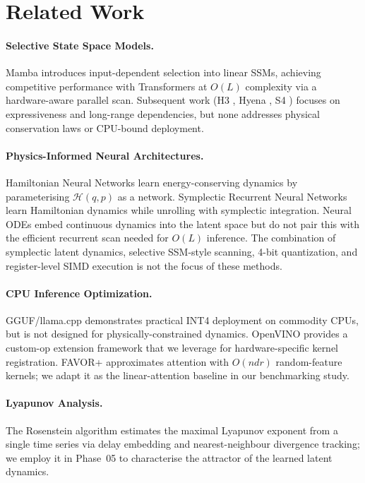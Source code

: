 \documentclass[10pt,twocolumn]{article}
\newcommand{\calH}{\mathcal{H}}
\begin{document}
\section{Related Work}
\label{sec:related}

\paragraph{Selective State Space Models.}
Mamba \cite{gu2023mamba} introduces input-dependent selection into linear SSMs,
achieving competitive performance with Transformers at $O(L)$ complexity via a
hardware-aware parallel scan.
Subsequent work (H3 \cite{fu2022hungry}, Hyena \cite{poli2023hyena},
S4 \cite{gu2021efficiently}) focuses on expressiveness and long-range
dependencies, but none addresses physical conservation laws
or CPU-bound deployment.

\paragraph{Physics-Informed Neural Architectures.}
Hamiltonian Neural Networks \cite{greydanus2019hamiltonian} learn
energy-conserving dynamics by parameterising $\calH(q,p)$ as a network.
Symplectic Recurrent Neural Networks \cite{chen2019symplectic} learn
Hamiltonian dynamics while unrolling with symplectic integration.
Neural ODEs \cite{chen2018neural} embed continuous dynamics into the
latent space but do not pair this with the efficient recurrent scan
needed for $O(L)$ inference.
The combination of symplectic latent dynamics, selective SSM-style scanning,
4-bit quantization, and register-level SIMD execution is not the focus of
these methods.

\paragraph{CPU Inference Optimization.}
GGUF/llama.cpp \cite{llamacpp} demonstrates practical INT4 deployment on
commodity CPUs, but is not designed for physically-constrained dynamics.
OpenVINO \cite{openvino} provides a custom-op extension framework that
we leverage for hardware-specific kernel registration.
FAVOR+ \cite{choromanski2020rethinking} approximates attention with
$O(ndr)$ random-feature kernels; we adapt it as the linear-attention
baseline in our benchmarking study.

\paragraph{Lyapunov Analysis.}
The Rosenstein algorithm \cite{rosenstein1993practical} estimates the
maximal Lyapunov exponent from a single time series via delay embedding and
nearest-neighbour divergence tracking; we employ it in Phase~05 to
characterise the attractor of the learned latent dynamics.
\end{document}
